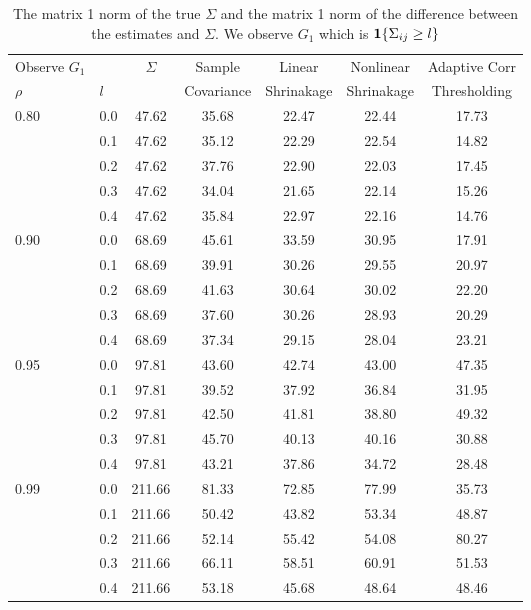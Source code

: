         \begin{table}
            
            \caption{The matrix 1 norm of the true \(\Sigma\) and the matrix 1 norm of the difference between the estimates and \(\Sigma\). We observe \(G_{1}\) which is \(\mathbf{1}\Bqty{\Sigma_{ij} \geq l}\)}
            \begin{tabular}{ll|ccccc}
                \toprule
                Observe \(G_{1}\) && \(\Sigma\) &Sample  &Linear  &Nonlinear &Adaptive Corr \\
                \(\rho\) &\(l\) &&Covariance&Shrinakage&Shrinakage&Thresholding\\
                \midrule
                0.80 &0.0 &47.62 &35.68 &22.47 &22.44 &17.73 \\
                     &0.1 &47.62 &35.12 &22.29 &22.54 &14.82 \\
                     &0.2 &47.62 &37.76 &22.90 &22.03 &17.45 \\
                     &0.3 &47.62 &34.04 &21.65 &22.14 &15.26 \\
                     &0.4 &47.62 &35.84 &22.97 &22.16 &14.76 \\
                0.90 &0.0 &68.69 &45.61 &33.59 &30.95 &17.91 \\
                     &0.1 &68.69 &39.91 &30.26 &29.55 &20.97 \\
                     &0.2 &68.69 &41.63 &30.64 &30.02 &22.20 \\
                     &0.3 &68.69 &37.60 &30.26 &28.93 &20.29 \\
                     &0.4 &68.69 &37.34 &29.15 &28.04 &23.21 \\
                0.95 &0.0 &97.81 &43.60 &42.74 &43.00 &47.35 \\
                     &0.1 &97.81 &39.52 &37.92 &36.84 &31.95 \\
                     &0.2 &97.81 &42.50 &41.81 &38.80 &49.32 \\
                     &0.3 &97.81 &45.70 &40.13 &40.16 &30.88 \\
                     &0.4 &97.81 &43.21 &37.86 &34.72 &28.48 \\
                0.99 &0.0 &211.66 &81.33 &72.85 &77.99 &35.73 \\
                     &0.1 &211.66 &50.42 &43.82 &53.34 &48.87 \\
                     &0.2 &211.66 &52.14 &55.42 &54.08 &80.27 \\
                     &0.3 &211.66 &66.11 &58.51 &60.91 &51.53 \\
                     &0.4 &211.66 &53.18 &45.68 &48.64 &48.46 \\
                \bottomrule
                \end{tabular}                
        \end{table}



